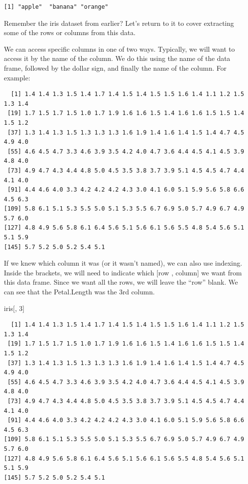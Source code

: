 \documentclass[
  letterpaper,
  DIV=11,
  numbers=noendperiod]{scrreprt}
\newenvironment{Shaded}{\begin{snugshade}}{\end{snugshade}}
\newcommand{\DecValTok}[1]{\textcolor[rgb]{0.68,0.00,0.00}{#1}}
\newcommand{\NormalTok}[1]{\textcolor[rgb]{0.00,0.23,0.31}{#1}}
\newcommand{\SpecialCharTok}[1]{\textcolor[rgb]{0.37,0.37,0.37}{#1}}
\begin{document}
\begin{verbatim}
[1] "apple"  "banana" "orange"
\end{verbatim}

Remember the iris dataset from earlier? Let's return to it to cover
extracting some of the rows or columns from this data.

We can access specific columns in one of two ways. Typically, we will
want to access it by the name of the column. We do this using the name
of the data frame, followed by the dollar sign, and finally the name of
the column. For example:

\begin{Shaded}
\end{Shaded}

\begin{verbatim}
  [1] 1.4 1.4 1.3 1.5 1.4 1.7 1.4 1.5 1.4 1.5 1.5 1.6 1.4 1.1 1.2 1.5 1.3 1.4
 [19] 1.7 1.5 1.7 1.5 1.0 1.7 1.9 1.6 1.6 1.5 1.4 1.6 1.6 1.5 1.5 1.4 1.5 1.2
 [37] 1.3 1.4 1.3 1.5 1.3 1.3 1.3 1.6 1.9 1.4 1.6 1.4 1.5 1.4 4.7 4.5 4.9 4.0
 [55] 4.6 4.5 4.7 3.3 4.6 3.9 3.5 4.2 4.0 4.7 3.6 4.4 4.5 4.1 4.5 3.9 4.8 4.0
 [73] 4.9 4.7 4.3 4.4 4.8 5.0 4.5 3.5 3.8 3.7 3.9 5.1 4.5 4.5 4.7 4.4 4.1 4.0
 [91] 4.4 4.6 4.0 3.3 4.2 4.2 4.2 4.3 3.0 4.1 6.0 5.1 5.9 5.6 5.8 6.6 4.5 6.3
[109] 5.8 6.1 5.1 5.3 5.5 5.0 5.1 5.3 5.5 6.7 6.9 5.0 5.7 4.9 6.7 4.9 5.7 6.0
[127] 4.8 4.9 5.6 5.8 6.1 6.4 5.6 5.1 5.6 6.1 5.6 5.5 4.8 5.4 5.6 5.1 5.1 5.9
[145] 5.7 5.2 5.0 5.2 5.4 5.1
\end{verbatim}

If we knew which column it was (or it wasn't named), we can also use
indexing. Inside the brackets, we will need to indicate which {[}row ,
column{]} we want from this data frame. Since we want all the rows, we
will leave the ``row'' blank. We can see that the Petal.Length was the
3rd column.

\begin{Shaded}
\begin{Highlighting}[]
\NormalTok{iris[, }\DecValTok{3}\NormalTok{]}
\end{Highlighting}
\end{Shaded}

\begin{verbatim}
  [1] 1.4 1.4 1.3 1.5 1.4 1.7 1.4 1.5 1.4 1.5 1.5 1.6 1.4 1.1 1.2 1.5 1.3 1.4
 [19] 1.7 1.5 1.7 1.5 1.0 1.7 1.9 1.6 1.6 1.5 1.4 1.6 1.6 1.5 1.5 1.4 1.5 1.2
 [37] 1.3 1.4 1.3 1.5 1.3 1.3 1.3 1.6 1.9 1.4 1.6 1.4 1.5 1.4 4.7 4.5 4.9 4.0
 [55] 4.6 4.5 4.7 3.3 4.6 3.9 3.5 4.2 4.0 4.7 3.6 4.4 4.5 4.1 4.5 3.9 4.8 4.0
 [73] 4.9 4.7 4.3 4.4 4.8 5.0 4.5 3.5 3.8 3.7 3.9 5.1 4.5 4.5 4.7 4.4 4.1 4.0
 [91] 4.4 4.6 4.0 3.3 4.2 4.2 4.2 4.3 3.0 4.1 6.0 5.1 5.9 5.6 5.8 6.6 4.5 6.3
[109] 5.8 6.1 5.1 5.3 5.5 5.0 5.1 5.3 5.5 6.7 6.9 5.0 5.7 4.9 6.7 4.9 5.7 6.0
[127] 4.8 4.9 5.6 5.8 6.1 6.4 5.6 5.1 5.6 6.1 5.6 5.5 4.8 5.4 5.6 5.1 5.1 5.9
[145] 5.7 5.2 5.0 5.2 5.4 5.1
\end{verbatim}
\end{document}
